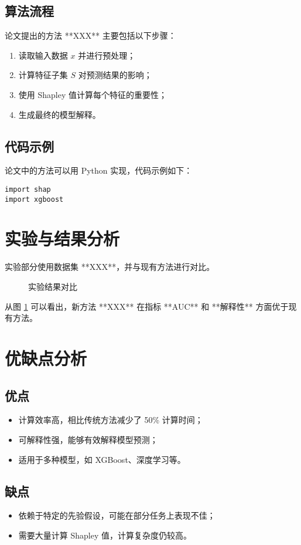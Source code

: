 \documentclass[a4paper,12pt]{article}
\begin{document}
\subsection{算法流程}
论文提出的方法 **XXX** 主要包括以下步骤：
\begin{enumerate}
    \item 读取输入数据 \( x \) 并进行预处理；
    \item 计算特征子集 \( S \) 对预测结果的影响；
    \item 使用 Shapley 值计算每个特征的重要性；
    \item 生成最终的模型解释。
\end{enumerate}

\subsection{代码示例}
论文中的方法可以用 Python 实现，代码示例如下：
\begin{lstlisting}
import shap
import xgboost
\end{lstlisting}

\section{实验与结果分析}
实验部分使用数据集 **XXX**，并与现有方法进行对比。

\begin{figure}[h]
    \centering
    \caption{实验结果对比}
    \label{fig:results}
\end{figure}

从图 \ref{fig:results} 可以看出，新方法 **XXX** 在指标 **AUC** 和 **解释性** 方面优于现有方法。

\section{优缺点分析}
\subsection{优点}
\begin{itemize}
    \item 计算效率高，相比传统方法减少了 50\% 计算时间；
    \item 可解释性强，能够有效解释模型预测；
    \item 适用于多种模型，如 XGBoost、深度学习等。
\end{itemize}

\subsection{缺点}
\begin{itemize}
    \item 依赖于特定的先验假设，可能在部分任务上表现不佳；
    \item 需要大量计算 Shapley 值，计算复杂度仍较高。
\end{itemize}
\end{document}
